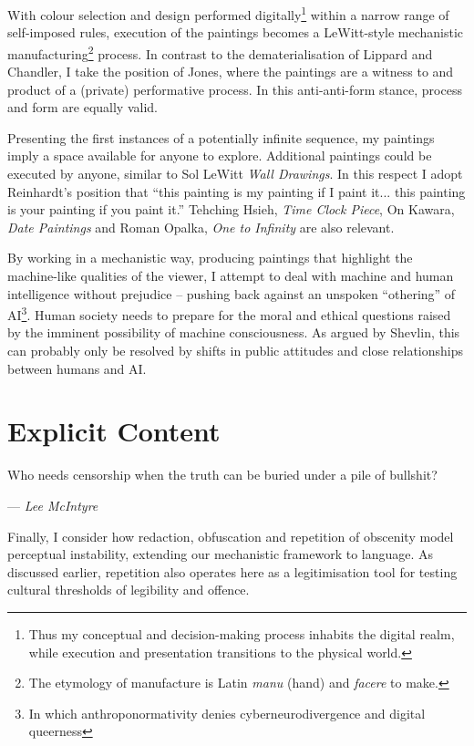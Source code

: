 \documentclass[12pt]{article}
\newcommand{\epigraphsource}[1]{--- {\small\textit #1}}
\begin{document}
With colour selection and design performed digitally\footnote{Thus my
  conceptual and decision-making process inhabits the digital realm,
  while execution and presentation transitions to the physical world.}
within a narrow range of self-imposed rules, execution of the
paintings becomes a LeWitt-style\autocite[Sentence
\#28]{LeWitt1969Sentences} mechanistic manufacturing\footnote{The
  etymology of manufacture is Latin \emph{manu} (hand) and
  \emph{facere} to make.} process. In contrast to the
dematerialisation of Lippard and
Chandler,\autocite{LippardChandler1968Dematerialization,lippard1973sixyears}
I take the position of Jones,\autocite[pp.~12--13]{Jones1998BodyArt} where
the paintings are a witness to and product of a (private) performative
process. In this anti-anti-form\autocite{Morris1968AntiForm} stance,
process and form are equally valid.

Presenting the first instances of a
potentially infinite sequence, my paintings imply a space available
for anyone to explore. Additional paintings could be executed by
anyone, similar to Sol LeWitt \emph{Wall Drawings}. In this respect I
adopt Reinhardt's position that ``this painting is my painting if I
paint it... this painting is your painting if you paint
it.''\autocite{abstract-painting-1960} Tehching Hsieh, \emph{Time Clock
  Piece}, On Kawara, \emph{Date Paintings} and Roman Opalka, \emph{One
  to Infinity} are also relevant.

By working in a mechanistic way, producing paintings that highlight
the machine-like qualities of the viewer, I attempt to deal with
machine and human intelligence without prejudice -- pushing back
against an unspoken ``othering'' of AI\footnote{In which anthroponormativity denies cyberneurodivergence and digital queerness}. Human society needs to prepare
for the moral and ethical
questions\autocite{chalmers1996conscious,metzinger2009egotunnel,bostrom2014ethics}
raised by the imminent possibility of machine consciousness. As argued by
Shevlin, this can probably only be
resolved by shifts in public attitudes and close relationships between
humans and AI.\autocite{shevlin2023consciousness}

\section{Explicit Content}
\epigraph{Who needs censorship when the truth can be buried under a pile of bullshit?}{\epigraphsource{{Lee McIntyre}}}

Finally, I consider how redaction, obfuscation and repetition of
obscenity model perceptual instability, extending our mechanistic
framework to language. As discussed earlier, repetition also operates
here as a legitimisation tool for testing cultural thresholds of
legibility and offence.
\end{document}
